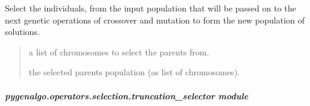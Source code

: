 \documentclass[letterpaper,10pt,english]{sphinxmanual}
\begin{document}
\begin{fulllineitems}
\begin{fulllineitems}
\label{\detokenize{pygenalgo.operators.selection:pygenalgo.operators.selection.tournament_selector.TournamentSelector.select}}
\pysigstartsignatures
{}
\pysigstopsignatures
\sphinxAtStartPar
Select the individuals, from the input population that will be passed on
to the next genetic operations of crossover and mutation to form the new
population of solutions.
\begin{quote}\begin{description}
\sphinxAtStartPar
{} \textendash{} a list of chromosomes to select the parents from.

\sphinxAtStartPar
the selected parents population (as list of chromosomes).

\end{description}\end{quote}

\end{fulllineitems}


\end{fulllineitems}



\subparagraph{pygenalgo.operators.selection.truncation\_selector module}
\label{\detokenize{pygenalgo.operators.selection:module-pygenalgo.operators.selection.truncation_selector}}\label{\detokenize{pygenalgo.operators.selection:pygenalgo-operators-selection-truncation-selector-module}}
\end{document}
